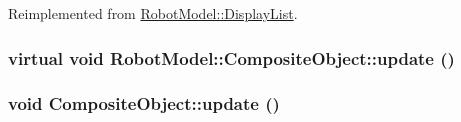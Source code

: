 Reimplemented from \hyperlink{class_robot_model_1_1_display_list_a6eb574d1f9929d9e2141dbacdeeb1b6a}{RobotModel::DisplayList}.\hypertarget{class_robot_model_1_1_composite_object_a9be8fd21b0ba19f4ad99d5767a30ea9e}{
\subsubsection[{update}]{\setlength{\rightskip}{0pt plus 5cm}virtual void RobotModel::CompositeObject::update ()}}
\label{class_robot_model_1_1_composite_object_a9be8fd21b0ba19f4ad99d5767a30ea9e}
\hypertarget{class_robot_model_1_1_composite_object_aacfefeee128f748e4e705708b9d958e3}{
\subsubsection[{update}]{\setlength{\rightskip}{0pt plus 5cm}void CompositeObject::update ()}}
\label{class_robot_model_1_1_composite_object_aacfefeee128f748e4e705708b9d958e3}


